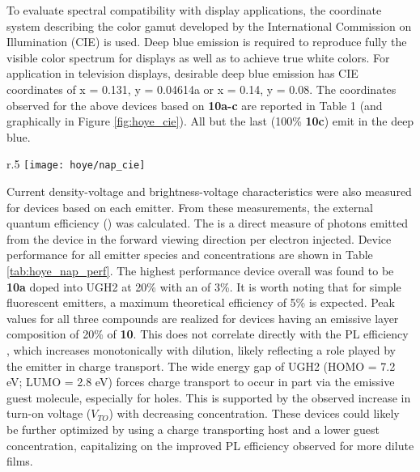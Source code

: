 \documentclass[../thesis.tex]{subfiles}
\begin{document}
To evaluate spectral compatibility with display applications, the coordinate system describing the color gamut developed by the International Commission on Illumination (CIE) is used. 
Deep blue emission is required to reproduce fully the visible color spectrum for displays as well as to achieve true white colors. 
For application in television displays, desirable deep blue emission has CIE coordinates of x = 0.131, y = 0.04614a or x = 0.14, y = 0.08.
The coordinates observed for the above devices based on \textbf{10a-c} are reported in Table 1 (and graphically in Figure \ref{fig:hoye_cie}). 
All but the last (100\% \textbf{10c}) emit in the deep blue.

\begin{wrapfigure}{r}{.5\textwidth}
\centering
\texttt{[image: hoye/nap\_cie]}
\caption{CIE coordinates of OLEDs.  Circles, squares, and triangles are 4, 20 and 100\%, respectively. Closed, open, and plus represent \textbf{10a}, \textbf{10b}, and \textbf{10c}, respectively.  Figure reproduced from \textcite{Xu2016}}
\label{fig:hoye_cie}
\end{wrapfigure}

Current density-voltage and brightness-voltage characteristics were also measured for devices based on each emitter. 
From these measurements, the external quantum efficiency (\eqe) was calculated. 
The \eqe is a direct measure of photons emitted from the device in the forward viewing direction per electron injected.
Device performance for all emitter species and concentrations are shown in Table \ref{tab:hoye_nap_perf}. 
The highest performance device overall was found to be \textbf{10a} doped into UGH2 at 20\% with an \eqe of 3\%. 
It is worth noting that for simple fluorescent emitters, a maximum theoretical efficiency of 5\% is expected.\supercite{Yang2004,Kim2015}
Peak \eqe values for all three compounds are realized for devices having an emissive layer composition of 20\% of \textbf{10}. 
This does not correlate directly with the PL efficiency \pl, which increases monotonically with dilution, likely reflecting a role played by the emitter in charge transport. 
The wide energy gap of UGH2 (HOMO = 7.2 eV; LUMO = 2.8 eV)\supercite{Ren2004} forces charge transport to occur in part via the emissive guest molecule, especially for holes. 
This is supported by the observed increase in turn-on voltage ($V_{TO}$) with decreasing concentration. 
These devices could likely be further optimized by using a charge transporting host and a lower guest concentration, capitalizing on the improved PL efficiency observed for more dilute films.
\end{document}
